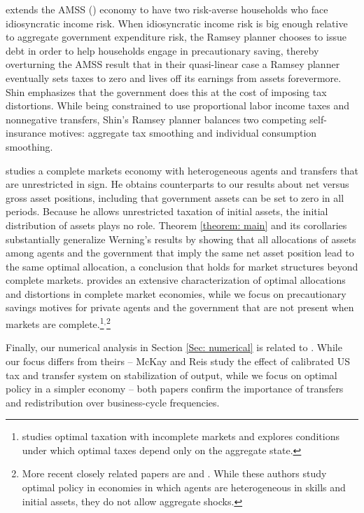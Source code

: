 \documentclass[thmsb,11pt]{article}
\begin{document}
\citet{shin2006ramsey} extends the AMSS  (\citet{Aiyagari2002}) economy to have two risk-averse households who
face idiosyncratic income risk. When idiosyncratic income risk is big enough
relative to aggregate government expenditure risk, the Ramsey planner
chooses to issue debt in order to help households engage in precautionary
saving, thereby overturning the AMSS result that  in their quasi-linear case a
 Ramsey planner  eventually sets taxes to zero and lives off its earnings from assets forevermore.
  Shin emphasizes that the
government does this at the cost of imposing tax distortions. While being
constrained to use proportional labor income taxes and nonnegative
transfers, Shin's Ramsey planner balances two competing self-insurance
motives: aggregate tax smoothing and individual consumption smoothing.

\citet{Wer07a} studies a complete markets economy with heterogeneous agents
and transfers that are unrestricted in sign. He obtains counterparts to our
results about net versus gross asset positions, including that government
assets can be set to zero in all periods. Because he allows unrestricted
taxation of initial assets, the initial distribution of assets plays no
role. Theorem \ref{theorem: main} and its corollaries substantially
generalize Werning's results by showing that all allocations of assets among
agents and the government that imply the same net asset position
lead to the same optimal allocation, a conclusion that holds for market
structures beyond complete markets. \citet{Wer07a} provides an extensive
characterization of optimal allocations and distortions in complete market
economies, while we focus on precautionary savings motives for private
agents and the government that are not present when markets are complete.\footnote{%
\cite{Werning2012} studies optimal taxation with incomplete markets and explores
conditions under which optimal taxes depend only on the aggregate state.}$^,$\footnote{%
More recent closely related papers are \citet{Azzimonti2008,Azzimonti2008a} and \citet{Correia2010}. While these authors study optimal policy in
 economies in which agents are heterogeneous in skills and initial assets, they
  do not allow aggregate shocks.}

  Finally, our numerical analysis in Section \ref{Sec: numerical} is related to \citet{mckay2013}. While our focus differs from theirs -- McKay and Reis study the effect of calibrated US tax and transfer system on stabilization of output, while we focus on optimal policy  in a  simpler economy -- both papers confirm the importance of transfers and redistribution over business-cycle frequencies.
\end{document}
